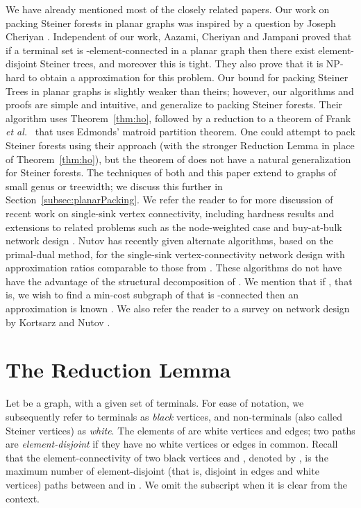 \documentclass[11pt]{article}
\newcommand{\etal}{{\em et al.}\ }
\begin{document}
\smallskip
{} We have already mentioned most of the
closely related papers. Our work on packing Steiner forests in planar
graphs was inspired by a question by Joseph Cheriyan
\cite{Cheriyan}. Independent of our work, Aazami, Cheriyan and Jampani
\cite{ACJ08} proved that if a terminal set  is
-element-connected in a planar graph then there exist 
element-disjoint Steiner trees, and moreover this is tight. They also
prove that it is NP-hard to obtain a  approximation for
this problem. Our bound for packing Steiner Trees in planar graphs is
slightly weaker than theirs; however, our algorithms and proofs are
simple and intuitive, and generalize to packing Steiner forests. Their
algorithm uses Theorem~\ref{thm:ho}, followed by a reduction to a
theorem of Frank \etal \cite{FKK} that uses Edmonds' matroid partition
theorem. One could attempt to pack Steiner forests using their
approach (with the stronger Reduction Lemma in place of
Theorem~\ref{thm:ho}), but the theorem of \cite{FKK} does not have a
natural generalization for Steiner forests.  The techniques of both
\cite{ACJ08} and this paper extend to graphs of small genus or
treewidth; we discuss this further in
Section~\ref{subsec:planarPacking}.  We refer the reader to
\cite{ChakCK08,ChuzhoyK08,ChekuriK08} for more discussion of recent
work on single-sink vertex connectivity, including hardness results
\cite{ChakCK08} and extensions to related problems such as the
node-weighted case \cite{ChuzhoyK08} and buy-at-bulk network design
\cite{ChekuriK08}. Nutov \cite{Nutov09} has recently given alternate
algorithms, based on the primal-dual method, for the single-sink
vertex-connectivity network design with approximation ratios
comparable to those from \cite{ChuzhoyK08}. These algorithms do not
have have the advantage of the structural decomposition of
\cite{ChuzhoyK08}. We mention that if , that is, we wish to find
a min-cost subgraph of  that is -connected then an 
approximation is known \cite{FakL08,KortsarzN05,CheriyanVV03}. We also
refer the reader to a survey on network design by Kortsarz and Nutov
\cite{KortsarzN_survey}.

\section{The Reduction Lemma}
Let  be a graph, with a given set  of
terminals. For ease of notation, we subsequently refer to terminals as
\emph{black} vertices, and non-terminals (also called Steiner
vertices) as \emph{white}. The elements of  are white vertices and
edges; two paths are \emph{element-disjoint} if they have no white
vertices or edges in common. Recall that the element-connectivity of
two black vertices  and , denoted by , is the
maximum number of element-disjoint (that is, disjoint in edges and
white vertices) paths between  and  in .  We omit the
subscript  when it is clear from the context.
\end{document}
